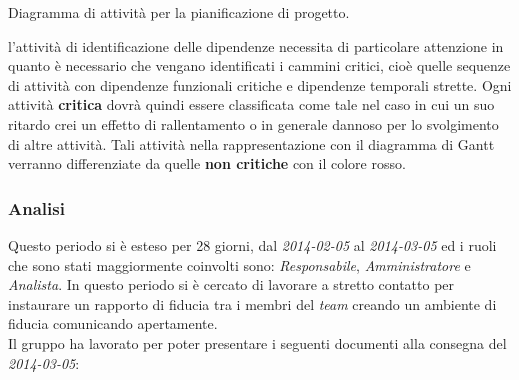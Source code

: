 \begin{center}
Diagramma di attività per la pianificazione di progetto.
\end{center}
l'attività di identificazione delle dipendenze necessita di particolare attenzione in quanto è necessario che vengano identificati i cammini critici, cioè quelle sequenze di attività con dipendenze funzionali critiche e dipendenze temporali strette. Ogni attività \textbf{critica} dovrà quindi essere classificata come tale nel caso in cui un suo ritardo crei un effetto di rallentamento o in generale dannoso per lo svolgimento di altre attività. Tali attività nella rappresentazione con il diagramma di Gantt verranno differenziate da quelle \textbf{non critiche} con il colore rosso.
\subsubsection{Analisi}
Questo periodo si è esteso per 28 giorni, dal \textit{2014-02-05} al \textit{2014-03-05} ed i ruoli che sono stati maggiormente coinvolti sono: \textit{Responsabile}, \textit{Amministratore} e \textit{Analista}.
In questo periodo si è cercato di lavorare a stretto contatto per instaurare un rapporto di fiducia tra i membri del \textit{team} creando un ambiente di fiducia comunicando apertamente.
\\
Il gruppo \gruppo ha lavorato per poter presentare i seguenti documenti alla consegna del \textit{2014-03-05}:\\
